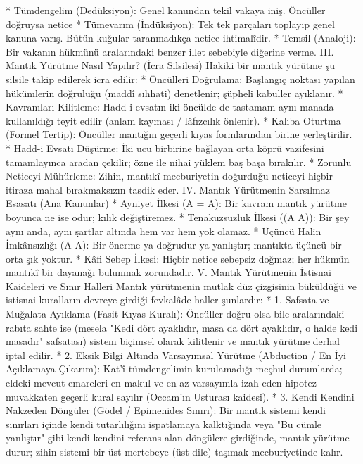 \documentclass[11pt,a4paper]{article}
\begin{document}
 * Tümdengelim (Dedüksiyon): Genel kanundan tekil vakaya iniş. Öncüller doğruysa netice %
 * Tümevarım (İndüksiyon): Tek tek parçaları toplayıp genel kanuna varış. Bütün kuğular taranmadıkça netice ihtimalîdir.
 * Temsil (Analoji): Bir vakanın hükmünü aralarındaki benzer illet sebebiyle diğerine verme.
III. Mantık Yürütme Nasıl Yapılır? (İcra Silsilesi)
Hakiki bir mantık yürütme şu silsile takip edilerek icra edilir:
 * Öncülleri Doğrulama: Başlangıç noktası yapılan hükümlerin doğruluğu (maddî sıhhati) denetlenir; şüpheli kabuller ayıklanır.
 * Kavramları Kilitleme: Hadd-i evsatın iki öncülde de tastamam aynı manada kullanıldığı teyit edilir (anlam kayması / lâfızcılık önlenir).
 * Kalıba Oturtma (Formel Tertip): Öncüller mantığın geçerli kıyas formlarından birine yerleştirilir.
 * Hadd-i Evsatı Düşürme: İki ucu birbirine bağlayan orta köprü vazifesini tamamlayınca aradan çekilir; özne ile nihai yüklem baş başa bırakılır.
 * Zorunlu Neticeyi Mühürleme: Zihin, mantıkî mecburiyetin doğurduğu neticeyi hiçbir itiraza mahal bırakmaksızın tasdik eder.
IV. Mantık Yürütmenin Sarsılmaz Esasatı (Ana Kanunlar)
 * Ayniyet İlkesi (A = A): Bir kavram mantık yürütme boyunca ne ise odur; kılık değiştiremez.
 * Tenakuzsuzluk İlkesi (\neg(A \wedge \neg A)): Bir şey aynı anda, aynı şartlar altında hem var hem yok olamaz.
 * Üçüncü Halin İmkânsızlığı (A \vee \neg A): Bir önerme ya doğrudur ya yanlıştır; mantıkta üçüncü bir orta şık yoktur.
 * Kâfi Sebep İlkesi: Hiçbir netice sebepsiz doğmaz; her hükmün mantıkî bir dayanağı bulunmak zorundadır.
V. Mantık Yürütmenin İstisnai Kaideleri ve Sınır Halleri
Mantık yürütmenin mutlak düz çizgisinin büküldüğü ve istisnai kuralların devreye girdiği fevkalâde haller şunlardır:
 * 1. Safsata ve Muğalata Ayıklama (Fasit Kıyas Kuralı):
   Öncüller doğru olsa bile aralarındaki rabıta sahte ise (mesela "Kedi dört ayaklıdır, masa da dört ayaklıdır, o halde kedi masadır" safsatası) sistem biçimsel olarak kilitlenir ve mantık yürütme derhal iptal edilir.
 * 2. Eksik Bilgi Altında Varsayımsal Yürütme (Abduction / En İyi Açıklamaya Çıkarım):
   Kat'î tümdengelimin kurulamadığı meçhul durumlarda; eldeki mevcut emareleri en makul ve en az varsayımla izah eden hipotez muvakkaten geçerli kural sayılır (Occam'ın Usturası kaidesi).
 * 3. Kendi Kendini Nakzeden Döngüler (Gödel / Epimenides Sınırı):
   Bir mantık sistemi kendi sınırları içinde kendi tutarlılığını ispatlamaya kalktığında veya "Bu cümle yanlıştır" gibi kendi kendini referans alan döngülere girdiğinde, mantık yürütme durur; zihin sistemi bir üst mertebeye (üst-dile) taşımak mecburiyetinde kalır.
\end{document}
